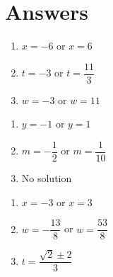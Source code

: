 \documentclass[11pt]{article}
\theoremstyle{definition}  %
\newcounter{HW}
\begin{document}
\newpage

\section{Answers}

\begin{multicols}{3}
\begin{enumerate}

\item  $x = -6$ or $x=6$ 

\item $t = -3$ or $t= \dfrac{11}{3}$

\item $w = -3$ or $w= 11$ 

\setcounter{HW}{\value{enumi}}
\end{enumerate}
\end{multicols}

\begin{multicols}{3}
\begin{enumerate}
\setcounter{enumi}{\value{HW}}

\item  $y = -1$ or $y= 1$

\item $m=-\dfrac{1}{2}$ or $m= \dfrac{1}{10}$

\item No solution

\setcounter{HW}{\value{enumi}}
\end{enumerate}
\end{multicols}

\begin{multicols}{3}
\begin{enumerate}
\setcounter{enumi}{\value{HW}}

\item  $x=-3$ or $x= 3$

\item $w = -\dfrac{13}{8}$ or $w= \dfrac{53}{8}$

\item $t = \dfrac{\sqrt{2} \pm 2}{3}$


\setcounter{HW}{\value{enumi}}
\end{enumerate}
\end{multicols}
\end{document}
